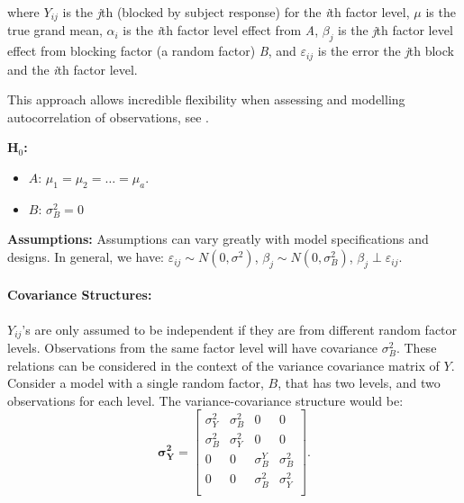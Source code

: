 \documentclass[12pt,english]{article}\usepackage[]{graphicx}\usepackage[table]{xcolor}
\begin{document}
\noindent where $Y_{ij}$ is the \textit{j}th (blocked by subject response) for the \textit{i}th factor level, $\mu$ is the true grand mean, $\alpha_i$ is the \textit{i}th factor level effect from \textit{A}, $\beta_j$ is the \textit{j}th factor level effect from blocking factor (a random factor) \textit{B}, and $\varepsilon_{ij}$ is the error the \textit{j}th block and the \textit{i}th factor level. 

\vspace{0.05in}
\noindent This approach allows incredible flexibility when assessing and modelling autocorrelation of observations, see \citep{aho2014}.\\
\vspace{.05in}

\noindent \textbf{H$_0$:}
\begin{itemize}
\item $A$: $\mu_1 = \mu_2 = \dots = \mu_a$.
\item $B$: $\sigma^2_B = 0$\\
\end{itemize}
\vspace{0.05in}

\noindent \textbf{Assumptions:}
Assumptions can vary greatly with model specifications and designs. In general, we have: $\varepsilon_{ij} \sim N(0, \sigma^2)$, \hspace{0.1in} $\beta_{j} \sim N(0, \sigma_B^2)$, \hspace{0.1in} $\beta_{j} \perp \varepsilon_{ij}.$

\vspace{0.1in}

\paragraph{Covariance Structures:}
$Y_{ij}$'s are only assumed to be independent if they are from different random factor levels. Observations from the same factor level will have covariance $\sigma^2_B$. These relations can be considered in the context of the variance covariance matrix of $Y$.  Consider a model with a single random factor, $B$, that has two levels, and two observations for each level. The variance-covariance structure would be:
\[\boldsymbol{\sigma^2_Y} = \left[
 \begin{matrix}
  \sigma^2_Y & \sigma^2_B & 0 & 0 \\
  \sigma^2_B & \sigma^2_Y & 0 & 0 \\
  0 & 0 & \sigma^Y_B & \sigma^2_B  \\
  0 & 0 & \sigma^2_B & \sigma^2_Y  \\
 \end{matrix}
\right].
 \]
\end{document}
